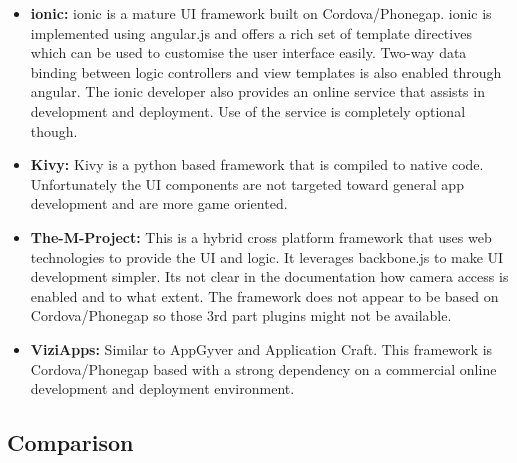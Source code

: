 \begin{itemize}[label={}]
\item \textbf{ionic:} ionic is a mature UI framework built on Cordova/Phonegap. ionic is implemented using angular.js and offers a rich set of template directives which can be used to customise the user interface easily. Two-way data binding between logic controllers and view templates is also enabled through angular. The ionic developer also provides an online service that assists in development and deployment. Use of the service is completely optional though.

\item \textbf{Kivy:} Kivy is a python based framework that is compiled to native code. Unfortunately the UI components are not targeted toward general app development and are more game oriented.

\item \textbf{The-M-Project:} This is a hybrid cross platform framework that uses web technologies to provide the UI and logic. It leverages backbone.js to make UI development simpler. Its not clear in the documentation how camera access is enabled and to what extent. The framework does not appear to be based on Cordova/Phonegap so those 3rd part plugins might not be available.

\item \textbf{ViziApps:} Similar to AppGyver and Application Craft. This framework is Cordova/Phonegap based with a strong dependency on a commercial online development and deployment environment.

\end{itemize}

\subsection{Comparison}

